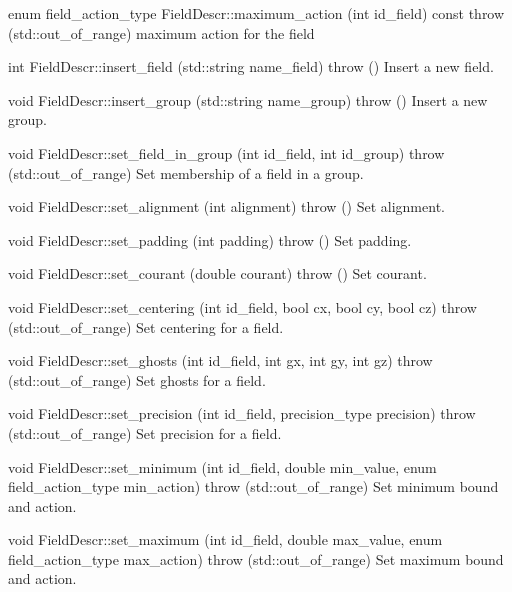 \documentclass{book}
\begin{document}
enum field\_action\_type 	FieldDescr::maximum\_action (int id\_field) const throw (std::out\_of\_range)
 	maximum action for the field

int 	FieldDescr::insert\_field (std::string name\_field) throw ()
 	Insert a new field.

void 	FieldDescr::insert\_group (std::string name\_group) throw ()
 	Insert a new group.

void 	FieldDescr::set\_field\_in\_group (int id\_field, int id\_group) throw (std::out\_of\_range)
 	Set membership of a field in a group.

void 	FieldDescr::set\_alignment (int alignment) throw ()
 	Set alignment.

void 	FieldDescr::set\_padding (int padding) throw ()
 	Set padding.

void 	FieldDescr::set\_courant (double courant) throw ()
 	Set courant.

void 	FieldDescr::set\_centering (int id\_field, bool cx, bool cy, bool cz) throw (std::out\_of\_range)
 	Set centering for a field.

void 	FieldDescr::set\_ghosts (int id\_field, int gx, int gy, int gz) throw (std::out\_of\_range)
 	Set ghosts for a field.

void 	FieldDescr::set\_precision (int id\_field, precision\_type precision) throw (std::out\_of\_range)
 	Set precision for a field.

void 	FieldDescr::set\_minimum (int id\_field, double min\_value, enum field\_action\_type min\_action) throw (std::out\_of\_range)
 	Set minimum bound and action.

void 	FieldDescr::set\_maximum (int id\_field, double max\_value, enum field\_action\_type max\_action) throw (std::out\_of\_range)
 	Set maximum bound and action. 



\subsection{}

\subsection{}

\section{}
\end{document}
